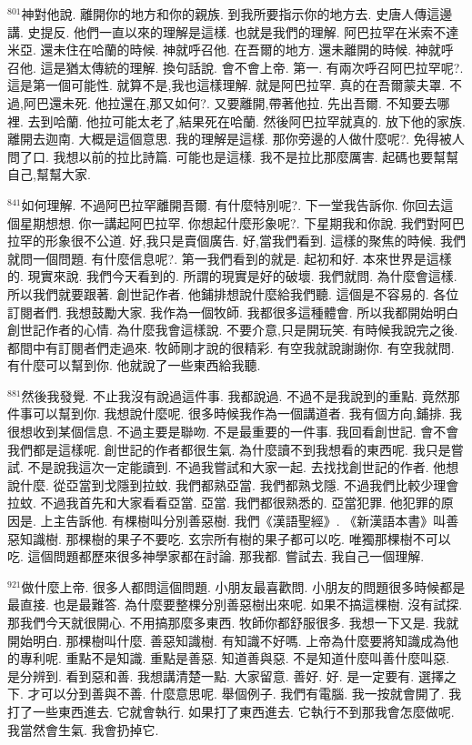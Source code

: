 \documentclass{book}
\begin{document}
$^{801}$神對他說.
離開你的地方和你的親族.
到我所要指示你的地方去.
史唐人傳這邊講.
史提反.
他們一直以來的理解是這樣.
也就是我們的理解.
阿巴拉罕在米索不達米亞.
還未住在哈蘭的時候.
神就呼召他.
在吾爾的地方.
還未離開的時候.
神就呼召他.
這是猶太傳統的理解.
換句話說.
會不會上帝.
第一.
有兩次呼召阿巴拉罕呢?.
這是第一個可能性.
就算不是,我也這樣理解.
就是阿巴拉罕.
真的在吾爾蒙夫罩.
不過,阿巴還未死.
他拉還在,那又如何?.
又要離開,帶著他拉.
先出吾爾.
不知要去哪裡.
去到哈蘭.
他拉可能太老了,結果死在哈蘭.
然後阿巴拉罕就真的.
放下他的家族.
離開去迦南.
大概是這個意思.
我的理解是這樣.
那你旁邊的人做什麼呢?.
免得被人問了口.
我想以前的拉比詩篇.
可能也是這樣.
我不是拉比那麼厲害.
起碼也要幫幫自己,幫幫大家.

$^{841}$如何理解.
不過阿巴拉罕離開吾爾.
有什麼特別呢?.
下一堂我告訴你.
你回去這個星期想想.
你一講起阿巴拉罕.
你想起什麼形象呢?.
下星期我和你說.
我們對阿巴拉罕的形象很不公道.
好,我只是賣個廣告.
好,當我們看到.
這樣的聚焦的時候.
我們就問一個問題.
有什麼信息呢?.
第一我們看到的就是.
起初和好.
本來世界是這樣的.
現實來說.
我們今天看到的.
所謂的現實是好的破壞.
我們就問.
為什麼會這樣.
所以我們就要跟著.
創世記作者.
他鋪排想說什麼給我們聽.
這個是不容易的.
各位訂閱者們.
我想鼓勵大家.
我作為一個牧師.
我都很多這種體會.
所以我都開始明白創世記作者的心情.
為什麼我會這樣說.
不要介意,只是開玩笑.
有時候我說完之後.
都間中有訂閱者們走過來.
牧師剛才說的很精彩.
有空我就說謝謝你.
有空我就問.
有什麼可以幫到你.
他就說了一些東西給我聽.

$^{881}$然後我發覺.
不止我沒有說過這件事.
我都說過.
不過不是我說到的重點.
竟然那件事可以幫到你.
我想說什麼呢.
很多時候我作為一個講道者.
我有個方向,鋪排.
我很想收到某個信息.
不過主要是聯吻.
不是最重要的一件事.
我回看創世記.
會不會我們都是這樣呢.
創世記的作者都很生氣.
為什麼讀不到我想看的東西呢.
我只是嘗試.
不是說我這次一定能讀到.
不過我嘗試和大家一起.
去找找創世記的作者.
他想說什麼.
從亞當到戈隱到拉蚊.
我們都熟亞當.
我們都熟戈隱.
不過我們比較少理會拉蚊.
不過我首先和大家看看亞當.
亞當.
我們都很熟悉的.
亞當犯罪.
他犯罪的原因是.
上主告訴他.
有棵樹叫分別善惡樹.
我們《漢語聖經》.
《新漢語本書》叫善惡知識樹.
那棵樹的果子不要吃.
玄宗所有樹的果子都可以吃.
唯獨那棵樹不可以吃.
這個問題都歷來很多神學家都在討論.
那我都.
嘗試去.
我自己一個理解.

$^{921}$做什麼上帝.
很多人都問這個問題.
小朋友最喜歡問.
小朋友的問題很多時候都是最直接.
也是最難答.
為什麼要整棵分別善惡樹出來呢.
如果不搞這棵樹.
沒有試探.
那我們今天就很開心.
不用搞那麼多東西.
牧師你都舒服很多.
我想一下又是.
我就開始明白.
那棵樹叫什麼.
善惡知識樹.
有知識不好嗎.
上帝為什麼要將知識成為他的專利呢.
重點不是知識.
重點是善惡.
知道善與惡.
不是知道什麼叫善什麼叫惡.
是分辨到.
看到惡和善.
我想講清楚一點.
大家留意.
善好.
好.
是一定要有.
選擇之下.
才可以分到善與不善.
什麼意思呢.
舉個例子.
我們有電腦.
我一按就會開了.
我打了一些東西進去.
它就會執行.
如果打了東西進去.
它執行不到那我會怎麼做呢.
我當然會生氣.
我會扔掉它.
\end{document}
